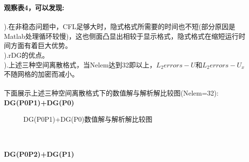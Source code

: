 \documentclass[a4paper,11pt,UTF8]{article}%
\theoremstyle{plain}
\begin{document}
\indent \textbf{观察表4，可以发现:}\\
~\\
).在非稳态问题中，CFL足够大时，隐式格式所需要的时间也不短(部分原因是Matlab处理循环较慢)，这也侧面凸显出相较于显示格式，隐式格式在缩短运行时间方面有着巨大优势。\\
).rDG的优点。\\
).上述三种空间离散格式，当Nelem达到32即以上，$L_2errors-U$和$L_2errors-U_x$不随网格的加密而减小。\\
~\\
\indent 下面展示上述三种空间离散格式下的数值解与解析解比较图(Nelem=32):\\
\clearpage
\textbf{DG(P0P1)+DG(P0)}
	\begin{figure}[H]
	\centering
	\hfill
	\caption{DG(P0P1)+DG(P0)数值解与解析解比较图}
\end{figure}\leavevmode\\
~\\
\textbf{DG(P0P2)+DG(P1)}
\end{document}
